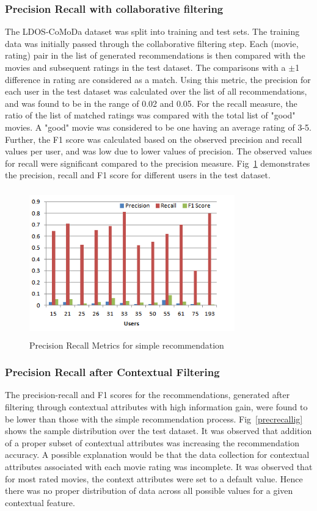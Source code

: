 \documentclass{article}
\begin{document}
\subsubsection{Precision Recall with collaborative filtering}
 The LDOS-CoMoDa dataset was split into training and test sets. The training data was initially passed through the collaborative filtering step. Each (movie, rating) pair in the list of generated recommendations is then compared with the movies and subsequent ratings in the test dataset. The comparisons with a $\pm$1 difference in rating are considered as a match. Using this metric, the precision for each user in the test dataset was calculated over the list of all recommendations, and was found to be in the range of 0.02 and 0.05. For the recall measure, the ratio of the list of matched ratings was compared with the total list of "good" movies. A "good" movie was considered to be one having an average rating of 3-5. Further, the F1 score was calculated based on the observed precision and recall values per user, and was low due to lower values of precision. The observed values for recall were significant compared to the precision measure. Fig~\ref{precrecallbasic} demonstrates the precision, recall and F1 score for different users in the test dataset.
 
 \begin{figure}[H]
\centering
\includegraphics[height=2.5in, width=3.5in]{PrecRecallBasic.png}
\caption{Precision Recall Metrics for simple recommendation}
\label{precrecallbasic}
\end{figure}

\subsubsection{Precision Recall after Contextual Filtering}
 The precision-recall and F1 scores for the recommendations, generated after filtering through contextual attributes with high information gain, were found to be lower than those with the simple recommendation process. Fig~\ref{precrecallig} shows the sample distribution over the test dataset. It was observed that addition of a proper subset of contextual attributes was increasing the recommendation accuracy. A possible explanation would be that the data collection for contextual attributes associated with each movie rating was incomplete. It was observed that for most rated movies, the context attributes were set to a default value. Hence there was no proper distribution of data across all possible values for a given contextual feature.
\end{document}

